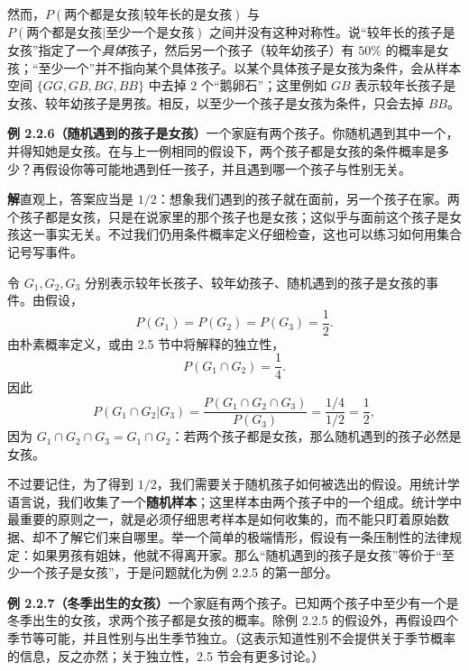 \documentclass[UTF8, 12pt, fontset=fandol, oneside]{ctexart}
\begin{document}
然而，$P(\text{两个都是女孩}|\text{较年长的是女孩})$ 与 $P(\text{两个都是女孩}|\text{至少一个是女孩})$ 之间并没有这种对称性。说“较年长的孩子是女孩”指定了一个\textit{具体}孩子，然后另一个孩子（较年幼孩子）有 $50\%$ 的概率是女孩；“至少一个”并不指向某个具体孩子。以某个具体孩子是女孩为条件，会从样本空间 $\{GG,GB,BG,BB\}$ 中去掉 $2$ 个“鹅卵石”；这里例如 $GB$ 表示较年长孩子是女孩、较年幼孩子是男孩。相反，以至少一个孩子是女孩为条件，只会去掉 $BB$。

\noindent\textbf{例 2.2.6（随机遇到的孩子是女孩）}\quad 一个家庭有两个孩子。你随机遇到其中一个，并得知她是女孩。在与上一例相同的假设下，两个孩子都是女孩的条件概率是多少？再假设你等可能地遇到任一孩子，并且遇到哪一个孩子与性别无关。

\noindent\textbf{解}\quad 直观上，答案应当是 $1/2$：想象我们遇到的孩子就在面前，另一个孩子在家。两个孩子都是女孩，只是在说家里的那个孩子也是女孩；这似乎与面前这个孩子是女孩这一事实无关。不过我们仍用条件概率定义仔细检查，这也可以练习如何用集合记号写事件。

令 $G_1,G_2,G_3$ 分别表示较年长孩子、较年幼孩子、随机遇到的孩子是女孩的事件。由假设，
\[
  P(G_1)=P(G_2)=P(G_3)=\frac12.
\]
由朴素概率定义，或由 2.5 节中将解释的独立性，
\[
  P(G_1\cap G_2)=\frac14.
\]
因此
\[
  P(G_1\cap G_2|G_3)
  =
  \frac{P(G_1\cap G_2\cap G_3)}{P(G_3)}
  =
  \frac{1/4}{1/2}
  =
  \frac12,
\]
因为 $G_1\cap G_2\cap G_3=G_1\cap G_2$：若两个孩子都是女孩，那么随机遇到的孩子必然是女孩。

不过要记住，为了得到 $1/2$，我们需要关于随机孩子如何被选出的假设。用统计学语言说，我们收集了一个\textbf{随机样本}；这里样本由两个孩子中的一个组成。统计学中最重要的原则之一，就是必须仔细思考样本是如何收集的，而不能只盯着原始数据、却不了解它们来自哪里。举一个简单的极端情形，假设有一条压制性的法律规定：如果男孩有姐妹，他就不得离开家。那么“随机遇到的孩子是女孩”等价于“至少一个孩子是女孩”，于是问题就化为例 2.2.5 的第一部分。

\noindent\textbf{例 2.2.7（冬季出生的女孩）}\quad 一个家庭有两个孩子。已知两个孩子中至少有一个是冬季出生的女孩，求两个孩子都是女孩的概率。除例 2.2.5 的假设外，再假设四个季节等可能，并且性别与出生季节独立。（这表示知道性别不会提供关于季节概率的信息，反之亦然；关于独立性，2.5 节会有更多讨论。）
\end{document}
